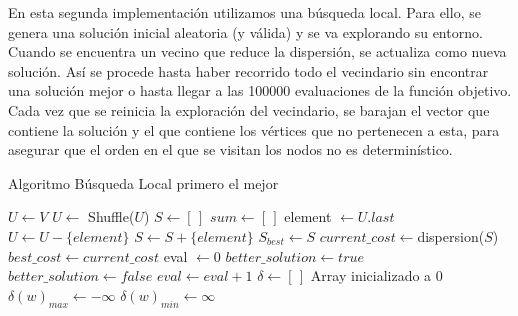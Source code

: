 En esta segunda implementación utilizamos una búsqueda local. Para ello, se genera una solución inicial aleatoria (y válida) y se va explorando su entorno. Cuando se encuentra un vecino que reduce la dispersión, se actualiza como nueva solución. Así se procede hasta haber recorrido todo el vecindario sin encontrar una solución mejor o hasta llegar a las 100000 evaluaciones de la función objetivo. Cada vez que se reinicia la exploración del vecindario, se barajan el vector que contiene la solución y el que contiene los vértices que no pertenecen a esta, para asegurar que el orden en el que se visitan los nodos no es determinístico.



\begin{algorithm}[H]
\caption{Algoritmo Búsqueda Local primero el mejor}
\begin{algorithmic}[1]
\State $U \gets V$
\State $U \gets$ Shuffle($U$)
\State $S \gets [ \, ]$
\State $sum \gets [ \, ]$
\State
{}
    \State element $\gets U.last$
    \State $U \gets U - \{element\}$
    \State $S \gets S + \{element\}$
\EndFor
\State
\State $S_{best} \gets S$
\State $current\_cost \gets $dispersion($S$)
\State $best\_cost \gets current\_cost$
\State
\State eval $\gets 0$
\State $better\_solution \gets true$
\State
{}
    \State $better\_solution \gets false$
    \State
            \State $eval \gets eval+1$
            \State $\delta \gets [\,]$ \Comment Array inicializado a 0
            \State $\delta(w)_{max} \gets -\infty$
            \State $\delta(w)_{min} \gets \infty$
            \State
{}
\end{algorithmic}
\end{algorithm}

